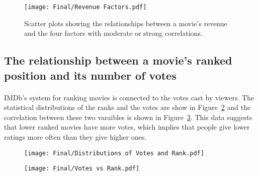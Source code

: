 \begin{multicols}{2}
                \begin{figure}[H]
                    \centering
                    \texttt{[image: Final/Revenue Factors.pdf]}
                    \caption{
                        Scatter plots showing the relationships between a movie's revenue and the four
                        factors with moderate or strong correlations.
                    }\label{fig-revenue-factors}
                \end{figure}
        \end{multicols}

    \subsection{The relationship between a movie's ranked position and its number of votes}
        \begin{multicols}{2}
            \paragraph{}
                IMDb's system for ranking movies is connected to the votes cast by viewers.
                The statistical distributions of the ranks and the votes are show in
                    Figure~\ref{fig-rank-vote-dist} and the correlation between these two varaibles
                    is shown in Figure~\ref{fig-rank-vote-corr}.
                This data suggests that lower ranked movies have more votes, which implies that
                    people give lower ratings more often than they give higher ones.

                \begin{figure}[H]
                    \centering
                    \texttt{[image: Final/Distributions of Votes and Rank.pdf]}
                    \caption{}\label{fig-rank-vote-dist}
                \end{figure}

                \begin{figure}[H]
                    \centering
                    \texttt{[image: Final/Votes vs Rank.pdf]}
                    \caption{}\label{fig-rank-vote-corr}
                \end{figure}
        \end{multicols}

